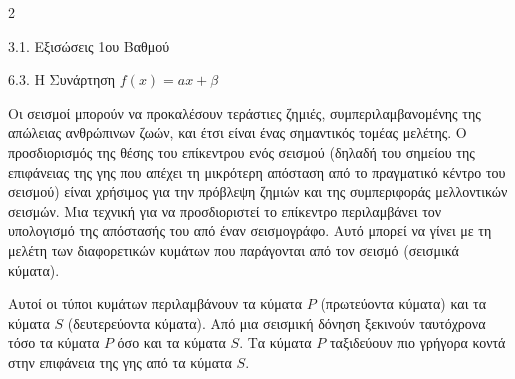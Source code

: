 \begin{ylh}{2}
    \item 3.1. Εξισώσεις 1ου Βαθμού
    \item 6.3. Η Συνάρτηση $f(x)=ax+\beta$
\end{ylh}

Οι σεισμοί μπορούν να προκαλέσουν τεράστιες ζημιές, συμπεριλαμβανομένης της απώλειας ανθρώπινων ζωών, και έτσι είναι ένας σημαντικός τομέας μελέτης. Ο προσδιορισμός της θέσης του επίκεντρου ενός σεισμού (δηλαδή του σημείου της επιφάνειας της γης που απέχει τη μικρότερη απόσταση από το πραγματικό κέντρο του σεισμού) είναι χρήσιμος για την πρόβλεψη ζημιών και της συμπεριφοράς μελλοντικών σεισμών. Μια τεχνική για να προσδιοριστεί το επίκεντρο περιλαμβάνει τον υπολογισμό της απόστασής του από έναν σεισμογράφο. Αυτό μπορεί να γίνει με τη μελέτη των διαφορετικών κυμάτων που παράγονται από τον σεισμό (σεισμικά κύματα).

Αυτοί οι τύποι κυμάτων περιλαμβάνουν τα κύματα $P$ (πρωτεύοντα κύματα) και τα κύματα $S$ (δευτερεύοντα κύματα). Από μια σεισμική δόνηση ξεκινούν ταυτόχρονα τόσο τα κύματα $P$ όσο και τα κύματα $S$. Τα κύματα $P$ ταξιδεύουν πιο γρήγορα κοντά στην επιφάνεια της γης από τα κύματα $S$.

